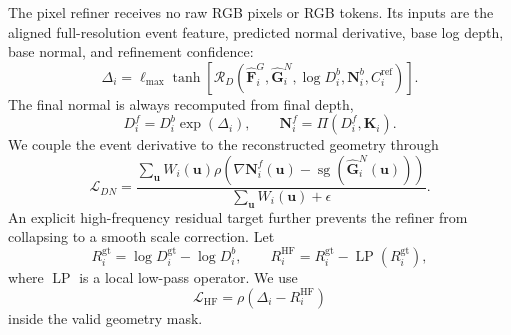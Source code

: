 The pixel refiner receives no raw RGB pixels or RGB tokens. Its inputs are the
aligned full-resolution event feature, predicted normal derivative, base log
depth, base normal, and refinement confidence:
\begin{equation}
    \Delta_i=\ell_{\max}\tanh\!\left[
    \mathcal R_D(\widehat{\bm F}_i^{G},
                 \widehat{\bm G}_i^{N},
                 \log D_i^{b},\bm N_i^{b},C_i^{\mathrm{ref}})
    \right].
\end{equation}
The final normal is always recomputed from final depth,
\begin{equation}
    D_i^{f}=D_i^{b}\exp(\Delta_i),
    \qquad
    \bm N_i^{f}=\Pi(D_i^{f},\bm K_i).
\end{equation}
We couple the event derivative to the reconstructed geometry through
\begin{equation}
    \mathcal L_{DN}
    =\frac{\sum_{\bm u}W_i(\bm u)
      \rho(\nabla\bm N_i^{f}(\bm u)-
           \operatorname{sg}(\widehat{\bm G}_i^{N}(\bm u)))}
     {\sum_{\bm u}W_i(\bm u)+\epsilon}.
\end{equation}
An explicit high-frequency residual target further prevents the refiner from
collapsing to a smooth scale correction. Let
\begin{equation}
    R_i^{\mathrm{gt}}=\log D_i^{\mathrm{gt}}-\log D_i^{b},
    \qquad
    R_i^{\mathrm{HF}}=R_i^{\mathrm{gt}}-
    \operatorname{LP}(R_i^{\mathrm{gt}}),
\end{equation}
where $\operatorname{LP}$ is a local low-pass operator. We use
\begin{equation}
    \mathcal L_{\mathrm{HF}}
    =\rho(\Delta_i-R_i^{\mathrm{HF}})
\end{equation}
inside the valid geometry mask.

